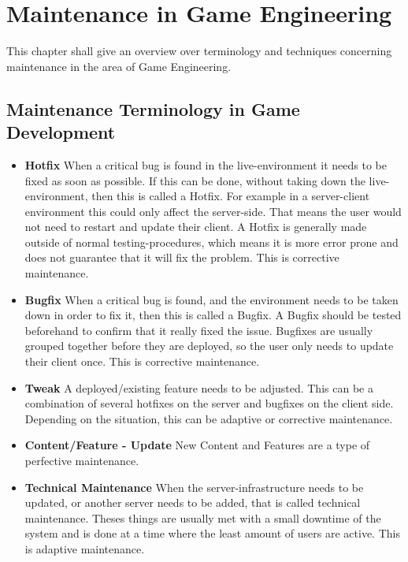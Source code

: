 \section{Maintenance in Game Engineering}
\label{sec:maintenanceGameEngineering}
This chapter shall give an overview over terminology and techniques concerning maintenance in the area of Game Engineering.

\subsection{Maintenance Terminology in Game Development}
\label{subsec:typeGameEngineering}
\begin{itemize}
    \item \textbf{Hotfix}\newline
    When a critical bug is found in the live-environment it needs to be fixed as soon as possible. If this can be done, without taking down the  live-environment, then this is called a Hotfix. For example in a server-client environment this could only affect the server-side. That means the user would not need to restart and update their client. A Hotfix is generally made outside of normal testing-procedures, which means it is more error prone and does not guarantee that it will fix the problem. This is corrective maintenance.\citep{seibert_interview_2016}
    \item \textbf{Bugfix}\newline
    When a critical bug is found, and the environment needs to be taken down in order to fix it, then this is called a Bugfix. A Bugfix should be tested beforehand to confirm that it really fixed the issue. Bugfixes are usually grouped together before they are deployed, so the user only needs to update their client once. This is corrective maintenance.\citep{seibert_interview_2016}
    \item \textbf{Tweak}\newline
    A deployed/existing feature needs to be adjusted. This can be a combination of several hotfixes on the server and bugfixes on the client side. Depending on the situation, this can be adaptive or corrective maintenance.\citep{seibert_interview_2016}
    \item \textbf{Content/Feature - Update}\newline
    New Content and Features are a type of perfective maintenance.
    \item \textbf{Technical Maintenance}\newline
    When the server-infrastructure needs to be updated, or another server needs to be added, that is called technical maintenance. Theses things are usually met with a small downtime of the system and is done at a time where the least amount of users are active. This is adaptive maintenance.\citep{seibert_interview_2016}
\end{itemize}

